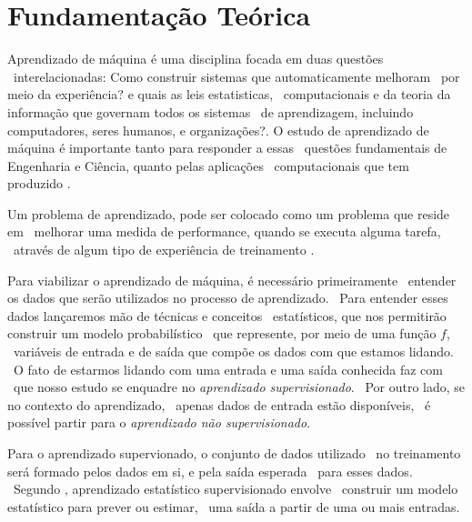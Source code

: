 \chapter{Fundamentação Teórica}

Aprendizado de máquina é uma disciplina focada em duas questões \
interelacionadas: Como construir sistemas que automaticamente melhoram \
por meio da experiência? e quais as leis estatisticas, \
computacionais e da teoria da informação que governam todos os sistemas \
de aprendizagem, incluindo computadores, seres humanos, e organizações?.
O estudo de aprendizado de máquina é importante tanto para responder a essas \
questões fundamentais de Engenharia e Ciência, quanto pelas aplicações \
computacionais que tem produzido \cite{Jordan}.

Um problema de aprendizado, pode ser colocado como um problema que reside em \
melhorar uma medida de performance, quando se executa alguma tarefa, \
através de algum tipo de experiência de treinamento \cite{Jordan}.

Para viabilizar o aprendizado de máquina, é necessário primeiramente \
entender os dados que serão utilizados no processo de aprendizado. \
Para entender esses dados lançaremos mão de técnicas e conceitos \
estatísticos, que nos permitirão construir um modelo probabilístico \
que represente, por meio de uma função $f$, \
variáveis de entrada e de saída que compõe os dados com que estamos lidando. \
O fato de estarmos lidando com uma entrada e uma saída conhecida faz com \
que nosso estudo se enquadre no \textit{aprendizado supervisionado}. \
Por outro lado, se no contexto do aprendizado, \
apenas dados de entrada estão disponíveis, \
é possível partir para o \textit{aprendizado não supervisionado}.

Para o aprendizado supervionado, o conjunto de dados utilizado \
no treinamento será formado pelos dados em si, e pela saída esperada \
para esses dados\cite{Louridas}. \
Segundo \cite{James}, aprendizado estatístico supervisionado envolve \
construir um modelo estatístico para prever ou estimar, \
uma saída a partir de uma ou mais entradas.



